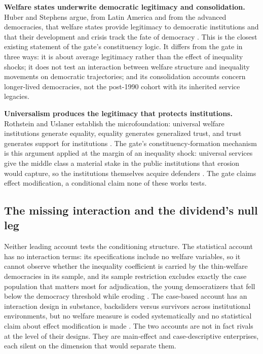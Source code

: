 \documentclass[11pt,letterpaper]{article}
\begin{document}
\textbf{Welfare states underwrite democratic legitimacy and consolidation.} Huber and Stephens argue, from Latin America and from the advanced democracies, that welfare states provide legitimacy to democratic institutions and that their development and crisis track the fate of democracy \citep{HuberStephens2001, HuberStephens2012}. This is the closest existing statement of the gate's constituency logic. It differs from the gate in three ways: it is about average legitimacy rather than the effect of inequality shocks; it does not test an interaction between welfare structure and inequality movements on democratic trajectories; and its consolidation accounts concern longer-lived democracies, not the post-1990 cohort with its inherited service legacies.

\textbf{Universalism produces the legitimacy that protects institutions.} Rothstein and Uslaner establish the microfoundation: universal welfare institutions generate equality, equality generates generalized trust, and trust generates support for institutions \citep{RothsteinUslaner2005}. The gate's constituency-formation mechanism is this argument applied at the margin of an inequality shock: universal services give the middle class a material stake in the public institutions that erosion would capture, so the institutions themselves acquire defenders \citep{Pierson1993, SossSchram2007, RothsteinUslaner2005}. The gate claims effect modification, a conditional claim none of these works tests.

\subsection{The missing interaction and the dividend's null leg}

Neither leading account tests the conditioning structure. The statistical account has no interaction terms: its specifications include no welfare variables, so it cannot observe whether the inequality coefficient is carried by the thin-welfare democracies in its sample, and its sample restriction excludes exactly the case population that matters most for adjudication, the young democratizers that fell below the democracy threshold while eroding \citep{RauStokes2025}. The case-based account has an interaction design in substance, backsliders versus survivors across institutional environments, but no welfare measure is coded systematically and no statistical claim about effect modification is made \citep{HaggardKaufman2021}. The two accounts are not in fact rivals at the level of their designs. They are main-effect and case-descriptive enterprises, each silent on the dimension that would separate them.
\end{document}
